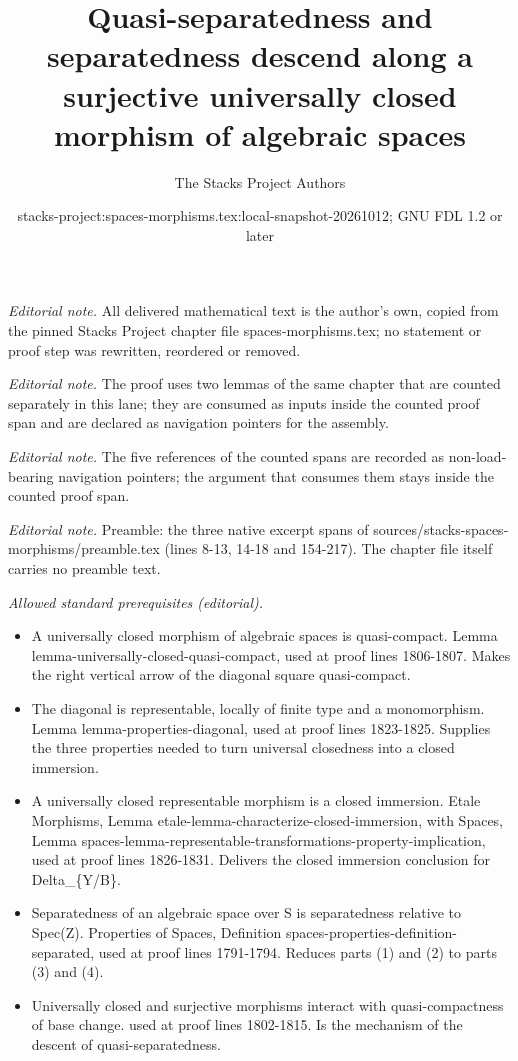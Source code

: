 \documentclass[10pt,a4paper]{amsart}
\title{Quasi-separatedness and separatedness descend along a surjective universally closed morphism of algebraic spaces}
\author{The Stacks Project Authors}
\date{stacks-project:spaces-morphisms.tex:local-snapshot-20261012; GNU FDL 1.2 or later}
\theoremstyle{plain}
\theoremstyle{definition}
\theoremstyle{remark}
\numberwithin{equation}{subsection}
\begin{document}
\maketitle
\setcounter{subsection}{1}
\noindent\textit{Editorial note.} All delivered mathematical text is the author's own, copied from the pinned Stacks Project chapter file spaces-morphisms.tex; no statement or proof step was rewritten, reordered or removed.\par\medskip
\noindent\textit{Editorial note.} The proof uses two lemmas of the same chapter that are counted separately in this lane; they are consumed as inputs inside the counted proof span and are declared as navigation pointers for the assembly.\par\medskip
\noindent\textit{Editorial note.} The five references of the counted spans are recorded as non-load-bearing navigation pointers; the argument that consumes them stays inside the counted proof span.\par\medskip
\noindent\textit{Editorial note.} Preamble: the three native excerpt spans of sources/stacks-spaces-morphisms/preamble.tex (lines 8-13, 14-18 and 154-217). The chapter file itself carries no preamble text.\par\medskip
\noindent\textit{Allowed standard prerequisites (editorial).}\begin{itemize}
\item A universally closed morphism of algebraic spaces is quasi-compact. Lemma lemma-universally-closed-quasi-compact, used at proof lines 1806-1807. Makes the right vertical arrow of the diagonal square quasi-compact.
\item The diagonal is representable, locally of finite type and a monomorphism. Lemma lemma-properties-diagonal, used at proof lines 1823-1825. Supplies the three properties needed to turn universal closedness into a closed immersion.
\item A universally closed representable morphism is a closed immersion. Etale Morphisms, Lemma etale-lemma-characterize-closed-immersion, with Spaces, Lemma spaces-lemma-representable-transformations-property-implication, used at proof lines 1826-1831. Delivers the closed immersion conclusion for Delta\_\{Y/B\}.
\item Separatedness of an algebraic space over S is separatedness relative to Spec(Z). Properties of Spaces, Definition spaces-properties-definition-separated, used at proof lines 1791-1794. Reduces parts (1) and (2) to parts (3) and (4).
\item Universally closed and surjective morphisms interact with quasi-compactness of base change. used at proof lines 1802-1815. Is the mechanism of the descent of quasi-separatedness.
\end{itemize}\medskip
\end{document}
